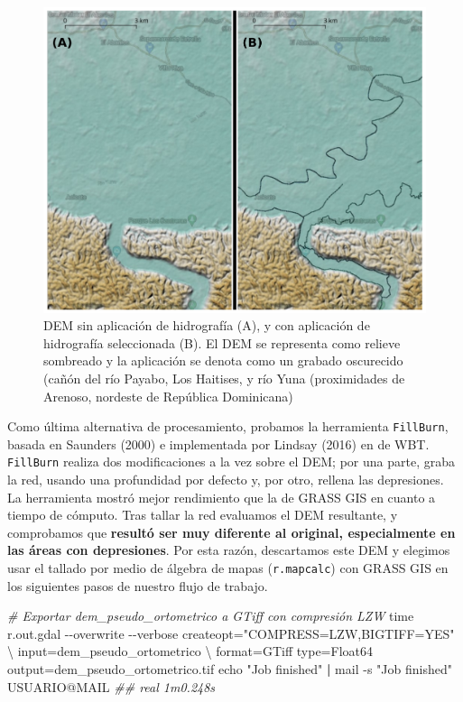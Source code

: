 \documentclass[spanish]{article}
\newenvironment{Shaded}{\begin{snugshade}}{\end{snugshade}}
\newcommand{\AttributeTok}[1]{\textcolor[rgb]{0.77,0.63,0.00}{#1}}
\newcommand{\BuiltInTok}[1]{#1}
\newcommand{\CommentTok}[1]{\textcolor[rgb]{0.56,0.35,0.01}{\textit{#1}}}
\newcommand{\DataTypeTok}[1]{\textcolor[rgb]{0.13,0.29,0.53}{#1}}
\newcommand{\ExtensionTok}[1]{#1}
\newcommand{\KeywordTok}[1]{\textcolor[rgb]{0.13,0.29,0.53}{\textbf{#1}}}
\newcommand{\NormalTok}[1]{#1}
\newcommand{\StringTok}[1]{\textcolor[rgb]{0.31,0.60,0.02}{#1}}
\begin{document}
\begin{figure}

{\centering \includegraphics[width=1\linewidth]{figuras/dem-sin-tallar-tallado} 

}

\caption{DEM sin aplicación de hidrografía (A), y con aplicación de hidrografía seleccionada (B). El DEM se representa como relieve sombreado y la aplicación se denota como un grabado oscurecido (cañón del río Payabo, Los Haitises, y río Yuna (proximidades de Arenoso, nordeste de República Dominicana)}\label{fig:demtallado}
\end{figure}

Como última alternativa de procesamiento, probamos la herramienta
\texttt{FillBurn}, basada en Saunders (2000) e implementada por Lindsay
(2016) en de WBT. \texttt{FillBurn} realiza dos modificaciones a la vez
sobre el DEM; por una parte, graba la red, usando una profundidad por
defecto y, por otro, rellena las depresiones. La herramienta mostró
mejor rendimiento que la de GRASS GIS en cuanto a tiempo de cómputo.
Tras tallar la red evaluamos el DEM resultante, y comprobamos que
\textbf{resultó ser muy diferente al original, especialmente en las
áreas con depresiones}. Por esta razón, descartamos este DEM y elegimos
usar el tallado por medio de álgebra de mapas (\texttt{r.mapcalc}) con
GRASS GIS en los siguientes pasos de nuestro flujo de trabajo.

\begin{Shaded}
\begin{Highlighting}[]
\CommentTok{\# Exportar dem\_pseudo\_ortometrico a GTiff con compresión LZW}
\BuiltInTok{time}\NormalTok{ r.out.gdal }\AttributeTok{{-}{-}overwrite} \AttributeTok{{-}{-}verbose}\NormalTok{ createopt=}\StringTok{"COMPRESS=LZW,BIGTIFF=YES"} \DataTypeTok{\textbackslash{}}
\NormalTok{ input=dem\_pseudo\_ortometrico }\DataTypeTok{\textbackslash{}}
\NormalTok{ format=GTiff type=Float64 output=dem\_pseudo\_ortometrico.tif}
\BuiltInTok{echo} \StringTok{"Job finished"} \KeywordTok{|} \ExtensionTok{mail} \AttributeTok{{-}s} \StringTok{"Job finished"}\NormalTok{ USUARIO@MAIL}
\CommentTok{\#\# real 1m0.248s}
\end{Highlighting}
\end{Shaded}
\end{document}
